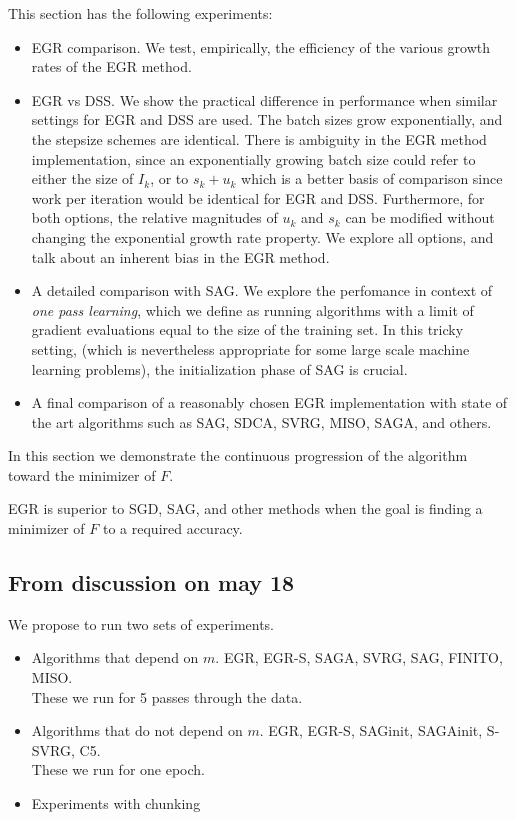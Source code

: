 \documentclass[11pt]{article}
\begin{document}
This section has the following experiments: 
\begin{itemize}
	\item EGR comparison. We test, empirically, the efficiency of the various growth rates of the EGR method. 
	\item EGR vs DSS. We show the practical difference in performance when similar settings for EGR and DSS are used. The batch sizes grow exponentially, and the stepsize schemes are identical. There is ambiguity in the EGR method implementation, since an exponentially growing batch size could refer to either the size of $I_k$, or to $s_k+u_k$ which is a better basis of comparison since work per iteration would be identical for EGR and DSS. Furthermore, for both options, the relative magnitudes of $u_k$ and $s_k$ can be modified without changing the exponential growth rate property. We explore all options, and talk about an inherent bias in the EGR method. 
	\item A detailed comparison with SAG. We explore the perfomance in context of \emph{one pass learning}, which we define as running algorithms with a limit of gradient evaluations equal to the size of the training set. In this tricky setting, (which is nevertheless appropriate for some large scale machine learning problems), the initialization phase of SAG is crucial. 
	\item A final comparison of a reasonably chosen EGR implementation with state of the art algorithms such as SAG, SDCA, SVRG, MISO, SAGA, and others. 
\end{itemize}

In this section we demonstrate the continuous progression of the algorithm toward the minimizer of $F$.

EGR is superior to SGD, SAG, and other methods when the goal is finding a minimizer of $F$ to a required accuracy.

\subsection{From discussion on may 18}

We propose to run two sets of experiments. 
\begin{itemize}
	\item Algorithms that depend on $m$. EGR, EGR-S, SAGA, SVRG, SAG, FINITO, MISO. \\
		  These we run for 5 passes through the data. 
    \item Algorithms that do not depend on $m$. EGR, EGR-S, SAGinit, SAGAinit, S-SVRG, C5. \\
		  These we run for one epoch.
    \item Experiments with chunking \\
\end{itemize}
\end{document}
